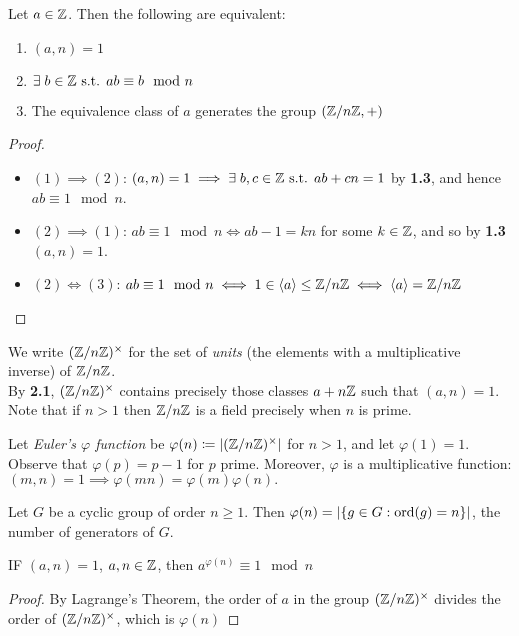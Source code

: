 \documentclass[10pt,a4paper]{article}
\begin{document}
\begin{lemma}
Let $a \in \mathbb{Z}$. Then the following are equivalent:
\begin{enumerate}
\item $(a,n) = 1$
\item $\exists b\in\Z\st ab\equiv b \mod n$
\item The equivalence class of $a$ generates the group $(\mathbb{Z}/n\mathbb{Z}, +)$
\end{enumerate}
\end{lemma}

\begin{proof}\item
\begin{itemize}
\item{$(1)\implies(2)$:} $(a,n) = 1 \implies \exists b, c \in \Z \st ab+cn=1$ by \textbf{1.3}, and hence $ab \equiv 1 \mod n$.
\item{$(2)\implies(1)$:} $ab \equiv 1 \mod n \iff ab-1=kn$ for some $k \in \mathbb{Z}$, and so by \textbf{1.3} $(a,n) = 1$.
\item{$(2)\iff (3)$:} $ab \equiv 1 \mod n \iff 1\in \langle a\rangle \leq \mathbb{Z}/n\mathbb{Z} \iff \langle a\rangle = \mathbb{Z}/n\mathbb{Z}$
\end{itemize}
\end{proof}

We write $(\mathbb{Z}/n\mathbb{Z})^\times$ for the set of \emph{units} (the elements with a multiplicative inverse) of $\mathbb{Z}/n\mathbb{Z}$.\\
By \textbf{2.1}, $(\mathbb{Z}/n\mathbb{Z})^{\times}$ contains precisely those classes $a+n\mathbb{Z}$ such that $(a,n) = 1$. Note that if $n>1$ then $\mathbb{Z}/n\mathbb{Z}$ is a field precisely when $n$ is prime.

Let \emph{Euler's $\varphi$ function} be $\varphi(n) \coloneqq \left|(\mathbb{Z}/n\mathbb{Z})^\times\right|$ for $n>1$, and let $\varphi(1)=1$. Observe that $\varphi(p) = p-1$ for $p$ prime. Moreover, $\varphi$ is a multiplicative function: $(m,n) = 1 \implies \varphi(mn) = \varphi(m)\varphi(n).$

\begin{corollary}
Let $G$ be a cyclic group of order $n\geq 1$. Then $\varphi(n) = |\{g\in G: \operatorname{ord}(g)=n\}| $, the number of generators of $G$.
\end{corollary}

\begin{theorem}
IF $(a,n)=1$, $a,n \in\mathbb{Z}$, then $a^{\varphi(n)} \equiv 1 \mod n$
\end{theorem}
\begin{proof}
By Lagrange's Theorem, the order of $a$ in the group $(\mathbb{Z}/n\mathbb{Z})^\times$ divides the order of $(\mathbb{Z}/n\mathbb{Z})^\times$, which is $\varphi(n)$
\end{proof}
\end{document}
